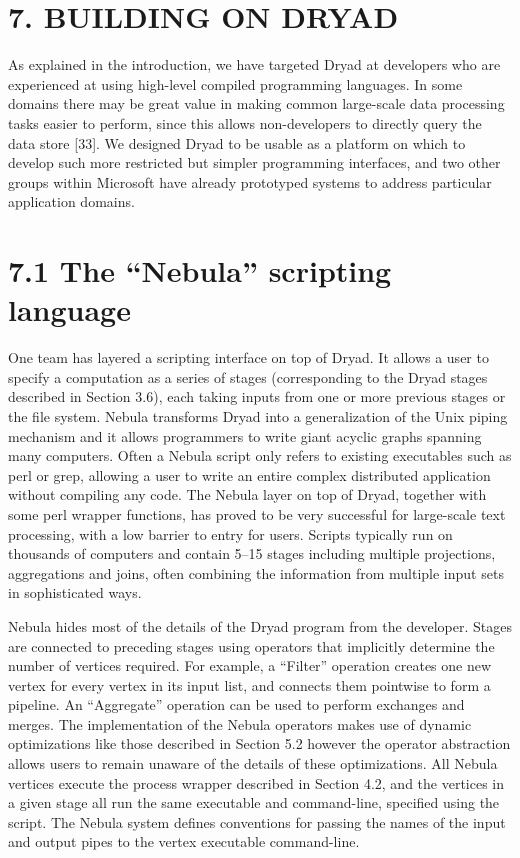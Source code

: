 \documentclass[
]{article}
\begin{document}
\section{7. BUILDING ON DRYAD}\label{building-on-dryad}

As explained in the introduction, we have targeted Dryad at developers
who are experienced at using high-level compiled programming languages.
In some domains there may be great value in making common large-scale
data processing tasks easier to perform, since this allows
non-developers to directly query the data store {[}33{]}. We designed
Dryad to be usable as a platform on which to develop such more
restricted but simpler programming interfaces, and two other groups
within Microsoft have already prototyped systems to address particular
application domains.

\section{7.1 The ``Nebula'' scripting
language}\label{the-nebula-scripting-language}

One team has layered a scripting interface on top of Dryad. It allows a
user to specify a computation as a series of stages (corresponding to
the Dryad stages described in Section 3.6), each taking inputs from one
or more previous stages or the file system. Nebula transforms Dryad into
a generalization of the Unix piping mechanism and it allows programmers
to write giant acyclic graphs spanning many computers. Often a Nebula
script only refers to existing executables such as perl or grep,
allowing a user to write an entire complex distributed application
without compiling any code. The Nebula layer on top of Dryad, together
with some perl wrapper functions, has proved to be very successful for
large-scale text processing, with a low barrier to entry for users.
Scripts typically run on thousands of computers and contain 5--15 stages
including multiple projections, aggregations and joins, often combining
the information from multiple input sets in sophisticated ways.

Nebula hides most of the details of the Dryad program from the
developer. Stages are connected to preceding stages using operators that
implicitly determine the number of vertices required. For example, a
``Filter'' operation creates one new vertex for every vertex in its
input list, and connects them pointwise to form a pipeline. An
``Aggregate'' operation can be used to perform exchanges and merges. The
implementation of the Nebula operators makes use of dynamic
optimizations like those described in Section 5.2 however the operator
abstraction allows users to remain unaware of the details of these
optimizations. All Nebula vertices execute the process wrapper described
in Section 4.2, and the vertices in a given stage all run the same
executable and command-line, specified using the script. The Nebula
system defines conventions for passing the names of the input and output
pipes to the vertex executable command-line.
\end{document}

